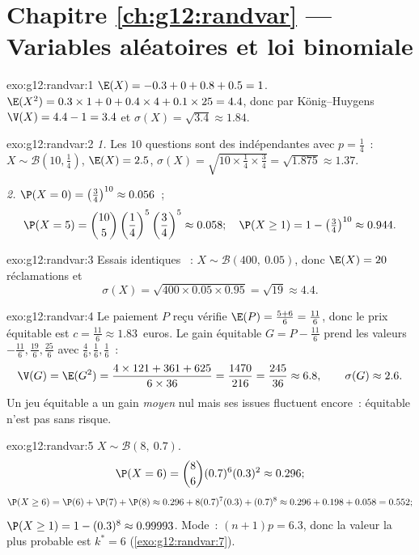 \section*{Chapitre \ref{ch:g12:randvar} --- Variables aléatoires et loi binomiale}

\begin{solution}{exo:g12:randvar:1}
$\E(X) = -0.3 + 0 + 0.8 + 0.5 = 1$.
$\E(X^2) = 0.3 \times 1 + 0 + 0.4\times4 + 0.1\times25 = 4.4$, donc par
König--Huygens $\V(X) = 4.4 - 1 = 3.4$ et
$\sigma(X) = \sqrt{3.4} \approx 1.84$.
\end{solution}

\begin{solution}{exo:g12:randvar:2}
\emph{1.} Les $10$ questions sont des  indépendantes
avec $p = \frac14$~: $X \sim \mathcal B\left(10, \frac14\right)$,
$\E(X) = 2.5$,
$\sigma(X) = \sqrt{10 \times \frac14 \times \frac34} = \sqrt{1.875}
\approx 1.37$.

\emph{2.} $\P(X = 0) = \left(\frac34\right)^{10} \approx 0.056$~;
\[
\P(X = 5) = \binom{10}{5}\left(\frac14\right)^5\left(\frac34\right)^5
\approx 0.058;
\quad
\P(X \geq 1) = 1 - \left(\tfrac34\right)^{10} \approx 0.944 .
\]
\end{solution}

\begin{solution}{exo:g12:randvar:3}
Essais identiques ~: $X \sim \mathcal B(400,\ 0.05)$, donc
$\E(X) = 20$ réclamations et
\[
\sigma(X) = \sqrt{400 \times 0.05 \times 0.95} = \sqrt{19} \approx 4.4 .
\]
\end{solution}

\begin{solution}{exo:g12:randvar:4}
Le paiement $P$ reçu vérifie
$\E(P) = \frac{5 + 6}{6} = \frac{11}{6}$, donc le prix équitable est
$c = \frac{11}{6} \approx 1.83$~euros. Le gain équitable
$G = P - \frac{11}6$ prend les valeurs $-\frac{11}{6}, \frac{19}{6},
\frac{25}{6}$ avec  $\frac46, \frac16, \frac16$~:
\[
\V(G) = \E(G^2)
= \frac{4 \times 121 + 361 + 625}{6 \times 36} = \frac{1470}{216}
= \frac{245}{36} \approx 6.8,
\qquad \sigma(G) \approx 2.6 .
\]
Un jeu équitable a un gain \emph{moyen} nul mais ses issues fluctuent
encore~: équitable n'est pas sans risque.
\end{solution}

\begin{solution}{exo:g12:randvar:5}
$X \sim \mathcal B(8,\ 0.7)$.
\[
\P(X = 6) = \binom86 (0.7)^6(0.3)^2 \approx 0.296 ;
\]
\[
\P(X \geq 6) = \P(6) + \P(7) + \P(8)
\approx 0.296 + 8(0.7)^7(0.3) + (0.7)^8
\approx 0.296 + 0.198 + 0.058 = 0.552 ;
\]
$\P(X \geq 1) = 1 - (0.3)^8 \approx 0.99993$. Mode~:
$(n+1)p = 6.3$, donc la valeur la plus probable est $k^* = 6$
(\cref{exo:g12:randvar:7}).
\end{solution}

